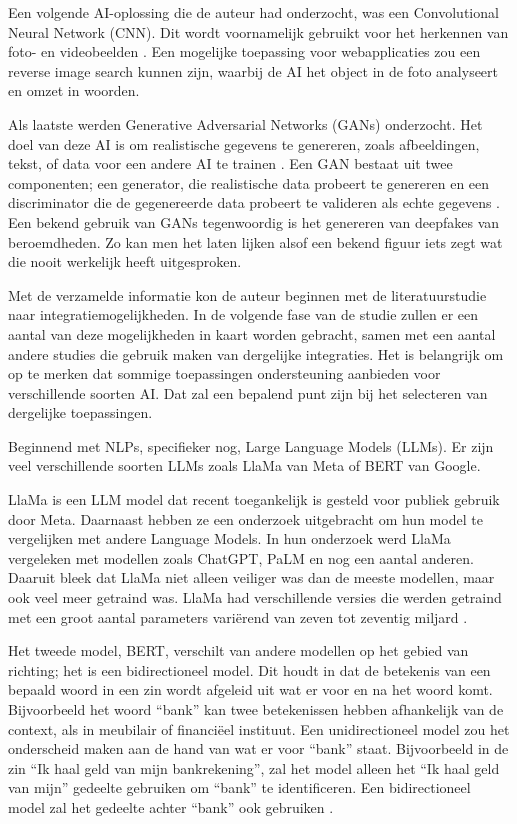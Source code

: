 \documentclass[dutch]{hogent-article}
\begin{document}
Een volgende AI-oplossing die de auteur had onderzocht, was een Convolutional Neural Network (CNN). Dit wordt voornamelijk gebruikt voor het herkennen van foto- en videobeelden \autocite{IBMCNN2023}. Een mogelijke toepassing voor webapplicaties zou een reverse image search kunnen zijn, waarbij de AI het object in de foto analyseert en omzet in woorden.

Als laatste werden Generative Adversarial Networks (GANs) onderzocht. Het doel van deze AI is om realistische gegevens te genereren, zoals afbeeldingen, tekst, of data voor een andere AI te trainen \autocite{Goodfellow2020}. Een GAN bestaat uit twee componenten; een generator, die realistische data probeert te genereren en een discriminator die de gegenereerde data probeert te valideren als echte gegevens \autocite{Goodfellow2020}. Een bekend gebruik van GANs tegenwoordig is het genereren van deepfakes van beroemdheden. Zo kan men het laten lijken alsof een bekend figuur iets zegt wat die nooit werkelijk heeft uitgesproken.

Met de verzamelde informatie kon de auteur beginnen met de literatuurstudie naar integratiemogelijkheden. In de volgende fase van de studie zullen er een aantal van deze mogelijkheden in kaart worden gebracht, samen met een aantal andere studies die gebruik maken van dergelijke integraties. Het is belangrijk om op te merken dat sommige toepassingen ondersteuning aanbieden voor verschillende soorten AI. Dat zal een bepalend punt zijn bij het selecteren van dergelijke toepassingen.

Beginnend met NLPs, specifieker nog, Large Language Models (LLMs). Er zijn veel verschillende soorten LLMs zoals LlaMa van Meta of BERT van Google. 

LlaMa is een LLM model dat recent toegankelijk is gesteld voor publiek gebruik door Meta. Daarnaast hebben ze een onderzoek uitgebracht om hun model te vergelijken met andere Language Models. In hun onderzoek werd LlaMa vergeleken met modellen zoals ChatGPT, PaLM en nog een aantal anderen. Daaruit bleek dat LlaMa niet alleen veiliger was dan de meeste modellen, maar ook veel meer getraind was. LlaMa had verschillende versies die werden getraind met een groot aantal parameters variërend van zeven tot zeventig miljard \autocite{Touvron2023Llama2O}.

Het tweede model, BERT, verschilt van andere modellen op het gebied van richting; het is een bidirectioneel model. Dit houdt in dat de betekenis van een bepaald woord in een zin wordt afgeleid uit wat er voor en na het woord komt. Bijvoorbeeld het woord “bank” kan twee betekenissen hebben afhankelijk van de context, als in meubilair of financiëel instituut. Een unidirectioneel model zou het onderscheid maken aan de hand van wat er voor “bank” staat. Bijvoorbeeld in de zin “Ik haal geld van mijn bankrekening”, zal het model alleen het “Ik haal geld van mijn” gedeelte gebruiken om “bank” te identificeren. Een bidirectioneel model zal het gedeelte achter “bank” ook gebruiken \autocite{Devlin2018}.
\end{document}
